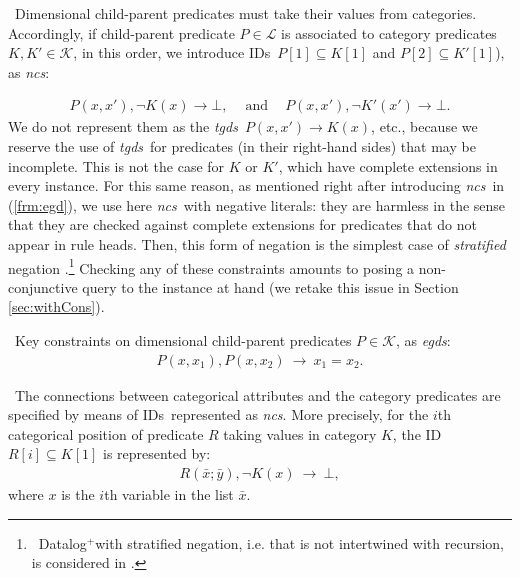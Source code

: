 \documentclass[format=acmsmall, review=false, screen=true]{acmart}
\newcommand{\mc}[1]{\mathcal{ #1}}
\newcommand{\dplus}{{Datalog}$^+$}
\newcommand{\idep}{ID}
\newcommand{\ideps}{IDs}
\newcommand{\egds}{{\em egds}}
\newcommand{\tgds}{{\em tgds}}
\newcommand{\ncs}{{\em ncs}}
\newcommand{\red}[1]{{#1}}
\newcommand{\blue}[1]{{#1}}
\begin{document}
\vspace{2mm}
 \  Dimensional child-parent predicates must take their values from categories. Accordingly, if child-parent predicate $P \in \mc{L}$ is associated to category predicates $K,K' \in \mc{K}$, in this order, we
introduce \ideps \ $P[1] \subseteq K[1]$ and $P[2] \subseteq K'[1]$), as \ncs:

\vspace{-4mm}
\begin{align}
P(x,x'), \lnot K(x) \rightarrow \bot, \ \ \ \ \mbox{ and } \ \ \ \  %
P(x,x'), \lnot K'(x') \rightarrow \bot.\label{frm:refh2}
\end{align}
We do not represent them as the \tgds \ $P(x,x') \rightarrow K(x)$, etc., because we reserve the use of \tgds \ for predicates (in their right-hand sides) that may be incomplete. This is not the case for $K$ or $K'$, which have complete extensions in every instance. \red{For this same reason, as mentioned right after introducing \ncs \ in (\ref{frm:egd}), we use here \ncs \ with negative literals: they are harmless in the sense that they are checked against complete extensions for predicates that do not appear in rule heads. Then, this form of negation is the simplest case of {\em stratified} negation \cite{abiteboul}.\footnote{\ \blue{\dplus with stratified negation, i.e. that is not intertwined with recursion, is considered in \cite{cali13}.}}}
Checking any of these constraints amounts to posing a non-conjunctive query to the instance at hand (we retake this issue in Section \ref{sec:withCons}).

\vspace{2mm}
 \ Key constraints on dimensional child-parent predicates $P \in \mc{K}$, as \egds:
\begin{align}
P(x,x_1),P(x,x_2) ~\rightarrow~ x_1=x_2.\label{frm:key}
\end{align}





 \
The connections between categorical attributes and the category predicates are specified by means of  \ideps \ represented as \ncs. More precisely, for the $i$th categorical position of predicate $R$ taking values in category $K$, the \idep \ $R[i] \subseteq K[1]$ is represented by:
\begin{align}
R(\bar{x};\bar{y}), \lnot K(x) ~\rightarrow~ \bot,\label{frm:referential}
\end{align}
where $x$ is the $i$th variable in the list $\bar{x}$.
\end{document}
